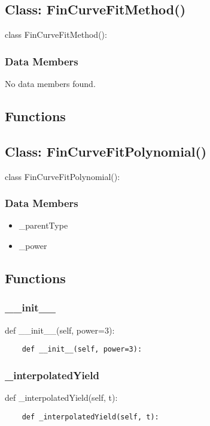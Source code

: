 \documentclass[twoside,11pt]{book}
\begin{document}
\subsection*{Class: FinCurveFitMethod()}
class FinCurveFitMethod(): 

\subsubsection*{Data Members}
No data members found.

\subsection*{Functions}

\subsection*{Class: FinCurveFitPolynomial()}
class FinCurveFitPolynomial(): 

\subsubsection*{Data Members}
\begin{itemize}
\item{\_parentType}
\item{\_power}
\end{itemize}

\subsection*{Functions}

\subsubsection*{{\bf \_\_init\_\_}}
def \_\_init\_\_(self, power=3): 

\begin{lstlisting}
    def __init__(self, power=3):
\end{lstlisting}

\subsubsection*{{\bf \_interpolatedYield}}
def \_interpolatedYield(self, t): 

\begin{lstlisting}
    def _interpolatedYield(self, t):
\end{lstlisting}
\end{document}
